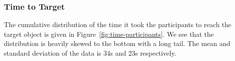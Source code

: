 \documentclass[a4paper, twoside]{article}
\begin{document}



\subsubsection{Time to Target}

\noindent The cumulative distribution of the time it took the participants to reach the target object is given in Figure~\ref{fig:time-participants}. We see that the distribution is heavily skewed to the bottom with a long tail. The mean and standard deviation of the data is 34s and 23s respectively. %
\end{document}
